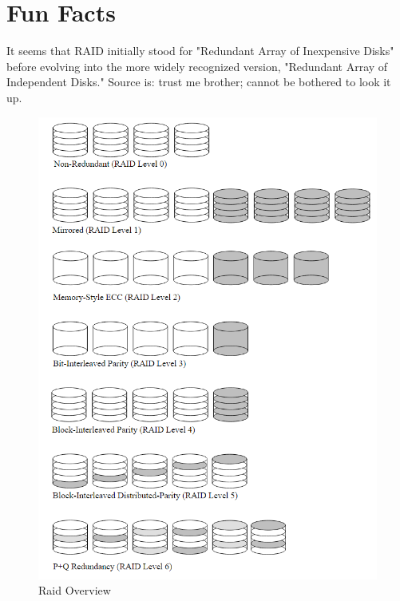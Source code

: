 \documentclass{article}
\begin{document}
\section*{Fun Facts}
It seems that RAID initially stood for "Redundant Array of Inexpensive Disks"
before evolving into the more widely recognized version, "Redundant Array of Independent Disks."
Source is: trust me brother; cannot be bothered to look it up.
\listoffigures
\listoftables


\begin{figure}[h]
    \label{fig:raid-overview}
    \includegraphics[width=\textwidth]{raid-overview}
    \caption{Raid Overview \cite{cmu:raidhighperf}}
\end{figure}
\end{document}
